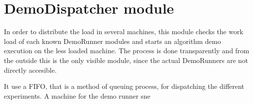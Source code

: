 \section{DemoDispatcher module}
\label{se:DemoDispatcher}
In order to distribute the load in several machines, this module checks the work load of each known DemoRunner modules and starts an algorithm demo execution on the less loaded machine. The process is done transparently and from the outside this is the only visible module, since the actual DemoRunners are not directly accesible.

It use a FIFO, that is a method of queuing process, for dispatching the different experiments. A machine for the demo runner sne


